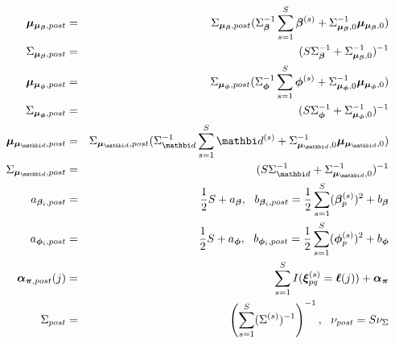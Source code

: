 \documentclass[12pt,titlepage,fleqn]{article}
\newcommand{\1}{{\bm 1}}
\newcommand{\vd}{\mathbi d}
\newcommand{\valpha}{\boldsymbol \alpha}
\newcommand{\vbeta}{\boldsymbol \beta}
\newcommand{\vphi}{\boldsymbol \phi}
\newcommand{\vxi}{\boldsymbol \xi}
\newcommand{\vell}{\boldsymbol \ell}
\newcommand{\vmu}{\boldsymbol{\mu}}
\newcommand{\vpi}{\boldsymbol{\pi}}
\newcommand{\s}{^{(s)}}
\newcommand{\half}{\frac{1}{2}}
\begin{document}
\begin{eqnarray*}
\vmu_{\vmu_{\vbeta},post}&=& \Sigma_{\vmu_{\vbeta},post}(\Sigma_{\vbeta}^{-1}\sum_{s=1}^S \vbeta\s + \Sigma_{\vmu_{\vbeta},0}^{-1}\vmu_{\vmu_{\vbeta},0})\\
\Sigma_{\vmu_{\vbeta},post}&=& (S\Sigma_{\vbeta}^{-1} + \Sigma_{\vmu_{\vbeta},0}^{-1})^{-1}\\
\vmu_{\vmu_{\vphi},post}&=& \Sigma_{\vmu_{\vphi},post}(\Sigma_{\vphi}^{-1}\sum_{s=1}^S \vphi\s + \Sigma_{\vmu_{\vphi},0}^{-1}\vmu_{\vmu_{\vphi},0})\\
\Sigma_{\vmu_{\vphi},post}&=& (S\Sigma_{\vphi}^{-1} + \Sigma_{\vmu_{\vphi},0}^{-1})^{-1}\\
\vmu_{\vmu_{\vd},post}&=& \Sigma_{\vmu_{\vd},post}(\Sigma_{\vd}^{-1}\sum_{s=1}^S \vd\s + \Sigma_{\vmu_{\vd},0}^{-1}\vmu_{\vmu_{\vd},0})\\
\Sigma_{\vmu_{\vd},post}&=& (S\Sigma_{\vd}^{-1} + \Sigma_{\vmu_{\vd},0}^{-1})^{-1}\\
a_{\vbeta_i,post}&=&\half S + a_{\vbeta}, ~~
b_{\vbeta_i,post}= \half\sum_{s=1}^S (\vbeta\s_p)^2+ b_{\vbeta}\\
a_{\vphi_i,post}&=&\half S + a_{\vphi}, ~~
b_{\vphi_i,post}=\half\sum_{s=1}^S (\vphi\s_p)^2 + b_{\vphi}\\
\valpha_{\vpi,post}(j)&=& \sum_{s=1}^S I(\vxi_{pq}\s=\vell(j)) + \valpha_{\vpi}\\
\Sigma_{post} &=& \left(\sum_{s=1}^S (\Sigma\s)^{-1}\right)^{-1}, ~~
\nu_{post} = S\nu_{\Sigma}
\end{eqnarray*}


\end{document}
